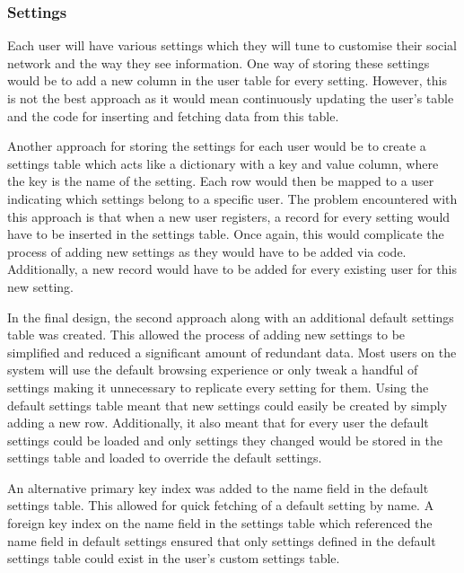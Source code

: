 \subsubsection{Settings}
Each user will have various settings which they will tune to customise their social network and the way they see information. One way of storing these settings would be to add a new column in the user table for every setting. However, this is not the best approach as it would mean continuously updating the user's table and the code for inserting and fetching data from this table.

Another approach for storing the settings for each user would be to create a settings table which acts like a dictionary with a key and value column, where the key is the name of the setting. Each row would then be mapped to a user indicating which settings belong to a specific user. The problem encountered with this approach is that when a new user registers, a record for every setting would have to be inserted in the settings table. Once again, this would complicate the process of adding new settings as they would have to be added via code. Additionally, a new record would have to be added for every existing user for this new setting.

In the final design, the second approach along with an additional default settings table was created. This allowed the process of adding new settings to be simplified and reduced a significant amount of redundant data. Most users on the system will use the default browsing experience or only tweak a handful of settings making it unnecessary to replicate every setting for them. Using the default settings table meant that new settings could easily be created by simply adding a new row. Additionally, it also meant that for every user the default settings could be loaded and only settings they changed would be stored in the settings table and loaded to override the default settings.

An alternative primary key index was added to the name field in the default settings table. This allowed for quick fetching of a default setting by name. A foreign key index on the name field in the settings table which referenced the name field in default settings ensured that only settings defined in the default settings table could exist in the user's custom settings table.

